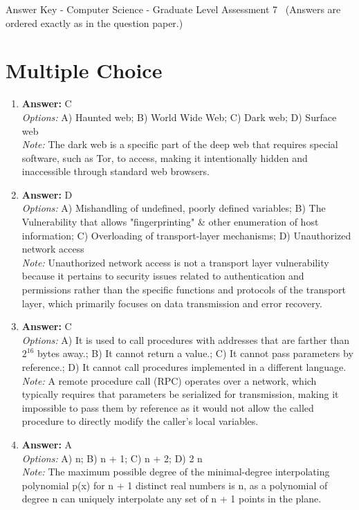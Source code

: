 \documentclass[12pt]{article}
\begin{document}
\begin{center}
Answer Key - Computer Science - Graduate Level Assessment 7 \
\small (Answers are ordered exactly as in the question paper.)
\end{center}

\section*{Multiple Choice}
\begin{enumerate}[label=\arabic*.]
\item \textbf{Answer:} C
\\ \textit{Options:} A) Haunted web; B) World Wide Web; C) Dark web; D) Surface web
\\ \textit{Note:} The dark web is a specific part of the deep web that requires special software, such as Tor, to access, making it intentionally hidden and inaccessible through standard web browsers.
\item \textbf{Answer:} D
\\ \textit{Options:} A) Mishandling of undefined, poorly defined variables; B) The Vulnerability that allows "fingerprinting" \& other enumeration of host information; C) Overloading of transport-layer mechanisms; D) Unauthorized network access
\\ \textit{Note:} Unauthorized network access is not a transport layer vulnerability because it pertains to security issues related to authentication and permissions rather than the specific functions and protocols of the transport layer, which primarily focuses on data transmission and error recovery.
\item \textbf{Answer:} C
\\ \textit{Options:} A) It is used to call procedures with addresses that are farther than $2^16$ bytes away.; B) It cannot return a value.; C) It cannot pass parameters by reference.; D) It cannot call procedures implemented in a different language.
\\ \textit{Note:} A remote procedure call (RPC) operates over a network, which typically requires that parameters be serialized for transmission, making it impossible to pass them by reference as it would not allow the called procedure to directly modify the caller's local variables.
\item \textbf{Answer:} A
\\ \textit{Options:} A) n; B) n + 1; C) n + 2; D) 2 n
\\ \textit{Note:} The maximum possible degree of the minimal-degree interpolating polynomial p(x) for n + 1 distinct real numbers is n, as a polynomial of degree n can uniquely interpolate any set of n + 1 points in the plane.

\end{enumerate}
\end{document}
